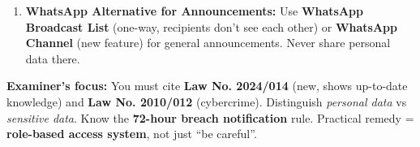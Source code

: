 \documentclass[11pt]{article}
\begin{document}
\begin{exoresolu}
\begin{enumerate}
\begin{enumerate}
\begin{itemize}
                            \item Appoint a \textbf{DPO} (can be a trained teacher/admin) and register with ANTIC.
                            \item Publish a \textbf{Privacy Notice} on school website and in admission pack.
                        \end{itemize}
                  \item \textbf{Ongoing:}
                        \begin{itemize}
                            \item Train staff on data protection (don't send grades via WhatsApp/email).
                            \item Conduct a \textbf{Data Protection Impact Assessment (DPIA)} for any new system (e.g., biometric attendance).
                            \item Establish \textbf{Data Breach Response Plan}: detect $\rightarrow$ contain $\rightarrow$ assess risk $\rightarrow$ notify ANTIC (72h) $\rightarrow$ notify affected parents $\rightarrow$ document.
                        \end{itemize}
              \end{enumerate}
        \item \textbf{WhatsApp Alternative for Announcements:} Use \textbf{WhatsApp Broadcast List} (one-way, recipients don't see each other) or \textbf{WhatsApp Channel} (new feature) for general announcements. Never share personal data there.
    \end{enumerate}
    \textbf{Examiner's focus:} You must cite \textbf{Law No. 2024/014} (new, shows up-to-date knowledge) and \textbf{Law No. 2010/012} (cybercrime). Distinguish \textit{personal data} vs \textit{sensitive data}. Know the \textbf{72-hour breach notification} rule. Practical remedy = \textbf{role-based access system}, not just ``be careful''.
\end{exoresolu}
\end{document}
